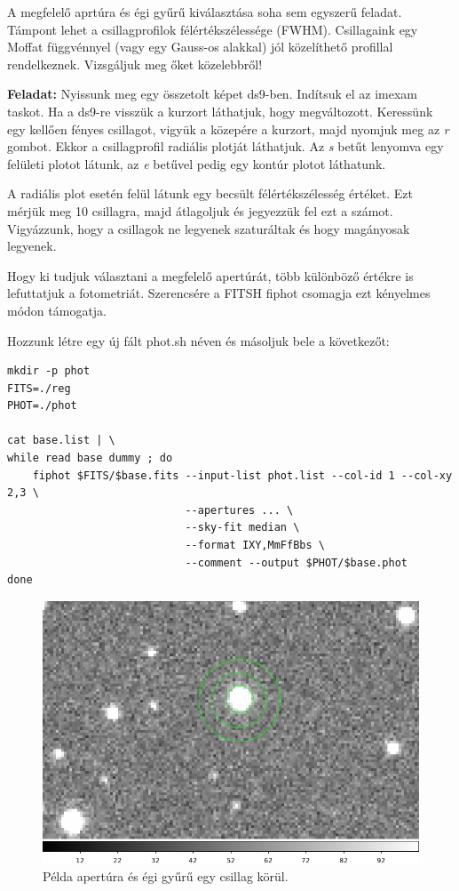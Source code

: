 \documentclass{article}
\begin{document}
A megfelelő aprtúra és égi gyűrű kiválasztása soha sem egyszerű feladat. Támpont
lehet a csillagprofilok félértékszélessége (FWHM). Csillagaink egy Moffat
függvénnyel (vagy egy Gauss-os alakkal) jól közelíthető profillal rendelkeznek.
Vizsgáljuk meg őket közelebbről!

{\bf Feladat:}
Nyissunk meg egy összetolt képet ds9-ben. Indítsuk el az imexam taskot.
Ha a ds9-re visszük a kurzort láthatjuk, hogy megváltozott. Keressünk egy
kellően fényes csillagot, vigyük a közepére a kurzort, majd nyomjuk meg az
{\it r} gombot. Ekkor a csillagprofil radiális plotját láthatjuk. Az {\it s}
betűt lenyomva egy felületi plotot látunk, az {\it e} betűvel pedig egy kontúr
plotot láthatunk.

A radiális plot esetén felül látunk egy becsült félértékszélesség értéket.
Ezt mérjük meg 10 csillagra, majd átlagoljuk és jegyezzük fel ezt a számot.
Vigyázzunk, hogy a csillagok ne legyenek szaturáltak és hogy magányosak
legyenek.


Hogy ki tudjuk választani a megfelelő apertúrát, több különböző értékre is
lefuttatjuk a fotometriát. Szerencsére a FITSH fiphot csomagja ezt kényelmes
módon támogatja.

Hozzunk létre egy új fált phot.sh néven és másoljuk bele a következőt:

\begin{verbatim}
mkdir -p phot
FITS=./reg
PHOT=./phot

cat base.list | \
while read base dummy ; do
    fiphot $FITS/$base.fits --input-list phot.list --col-id 1 --col-xy 2,3 \
                            --apertures ... \
                            --sky-fit median \
                            --format IXY,MmFfBbs \
                            --comment --output $PHOT/$base.phot
done
\end{verbatim}

\begin{figure}[ht!]
    \centering
    \includegraphics[width=0.6\linewidth]{pics/aperture.png}
    \caption{Példa apertúra és égi gyűrű egy csillag körül.}
    \label{apert}
\end{figure}
\end{document}
